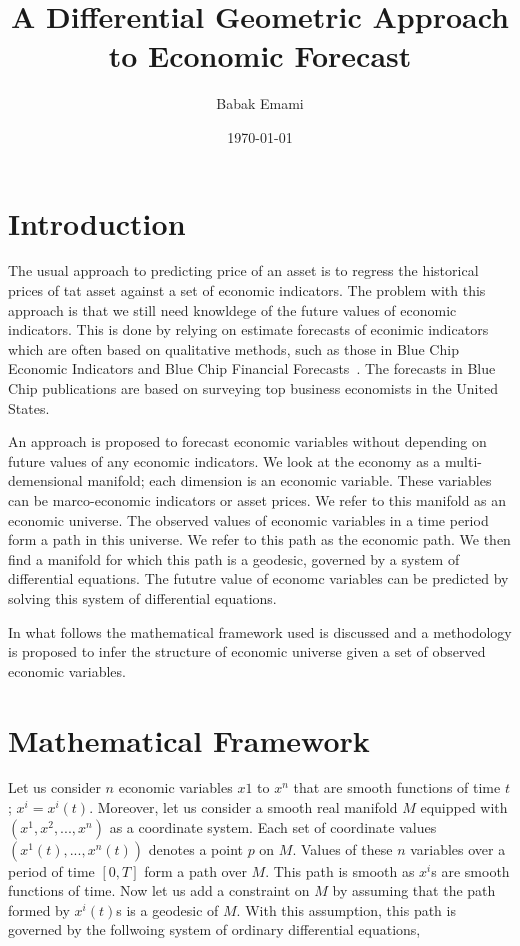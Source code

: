 \documentclass{article}
\title{A Differential Geometric Approach to Economic Forecast}
\author{Babak Emami}
\date{\today}
\begin{document}
\maketitle

\begin{abstract}


\end{abstract}

\section{Introduction}\label{section:introduction}

The usual approach to predicting price of an asset is to regress the
historical prices of tat asset against a set of economic
indicators. The problem with this approach is that we still need
knowldege of the future values of economic indicators. This is done by
relying on estimate forecasts of econimic indicators which are often
based on qualitative methods, such as those in Blue Chip Economic
Indicators and Blue Chip Financial Forecasts~\cite{ref:blue-chip}. The
forecasts in Blue Chip publications are based on surveying top
business economists in the United States.

An approach is proposed to forecast economic variables without
depending on future values of any economic indicators. We look at the
economy as a multi-demensional manifold; each dimension is an economic
variable. These variables can be marco-economic indicators or asset
prices. We refer to this manifold as an economic universe. The
observed values of economic variables in a time period form a path in
this universe. We refer to this path as the economic path. We then
find a manifold for which this path is a geodesic, governed by a
system of differential equations. The fututre value of economc
variables can be predicted by solving this system of differential
equations.

In what follows the mathematical framework used is discussed and a
methodology is proposed to infer the structure of economic universe
given a set of observed economic variables.

\section{Mathematical Framework}\label{section:mathematical-framework}

Let us consider $n$ economic variables $x{1}$ to $x^{n}$ that are
smooth functions of time $t$; $x^{i} = x^{i}(t)$. Moreover, let us
consider a smooth real manifold $M$ equipped with
$(x^{1},x^{2},...,x^{n})$ as a coordinate system. Each set of
coordinate values $(x^{1}(t),...,x^{n}(t))$ denotes a point $p$ on
$M$. Values of these $n$ variables over a period of time $[0,T]$ form
a path over $M$. This path is smooth as $x^{i}$s are smooth functions
of time. Now let us add a constraint on $M$ by assuming that the path
formed by $x^{i}(t)$s is a geodesic of $M$. With this assumption, this
path is governed by the follwoing system of ordinary differential
equations,
\end{document}
